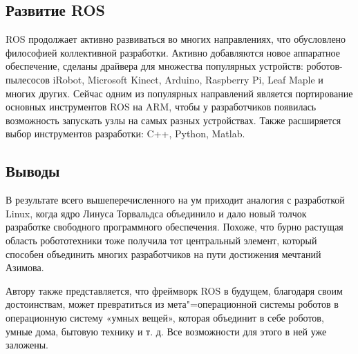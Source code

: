 \documentclass[10pt, a5paper]{article}
\begin{document}
\subsection*{Развитие ROS}

ROS продолжает активно развиваться во многих направлениях, что обусловлено философией коллективной разработки. Активно добавляются новое аппаратное обеспечение, сделаны драйвера для множества популярных устройств: роботов-пылесосов iRobot, Microsoft Kinect, Arduino, Raspberry Pi, Leaf Maple и многих других. Сейчас одним из популярных направлений является портирование основных инструментов ROS на ARM, чтобы у разработчиков появилась возможность запускать узлы на самых разных устройствах. Также расширяется выбор инструментов разработки: C++, Python, Matlab.

\subsection*{Выводы}

В результате всего вышеперечисленного на ум приходит аналогия с разработкой Linux, когда ядро Линуса Торвальдса объединило и дало новый толчок разработке свободного программного обеспечения. Похоже, что бурно растущая область робототехники тоже получила тот центральный элемент, который способен объединить  многих разработчиков на пути достижения мечтаний Азимова.

Автору также представляется, что фреймворк ROS в будущем, благодаря своим достоинствам, может превратиться из мета"=опера\-ционной системы роботов в  операционную систему «умных вещей», которая объединит в себе роботов, умные дома, бытовую технику и т. д. Все возможности для этого в ней уже заложены.

\end{document}

